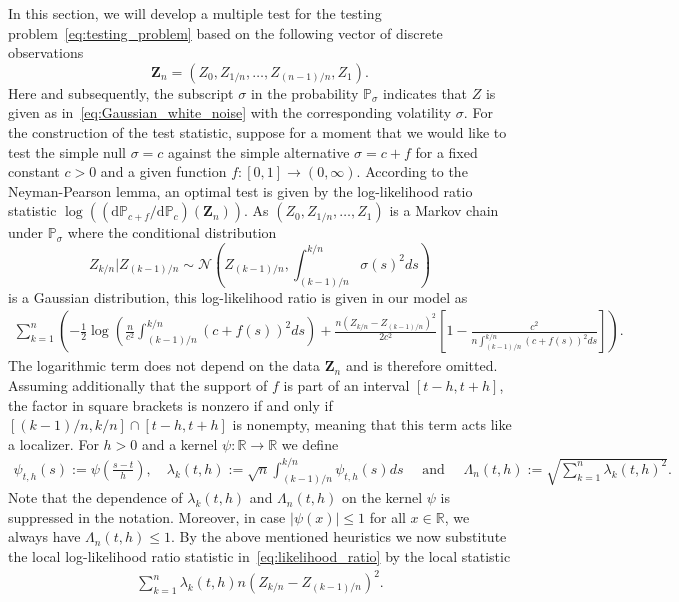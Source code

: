 \documentclass[10.5pt,letter]{article}
\numberwithin{equation}{section}
\theoremstyle{definition}
\newcommand{\R}{\mathbb{R}}
\renewcommand{\P}{\mathbb{P}}
\newcommand{\1}{\mathbbm{1}}
\begin{document}
In this section, we will develop a multiple test for the testing problem~\eqref{eq:testing_problem} based on the following vector of discrete observations
\[ \mathbf{Z}_n = \left( Z_0, Z_{1/n}, \dots, Z_{(n-1)/n}, Z_1\right).\]
Here and subsequently, the subscript $\sigma$ in the probability $\P_\sigma$ indicates that $Z$ is given as in~\eqref{eq:Gaussian_white_noise} with the corresponding volatility $\sigma$.
For the construction of the test statistic, suppose for a moment that we would like to test the simple null $\sigma=c$ against the simple alternative $\sigma=c+f$ for a fixed constant $c>0$ and a given function $f:[0,1]\rightarrow (0,\infty)$. According to the Neyman-Pearson lemma, an optimal test is given by the log-likelihood ratio statistic $\log((\textrm{d}\P_{c+f}/\textrm{d}\P_c)(\mathbf{Z}_n))$. As $(Z_0,Z_{1/n},\dots, Z_1)$ is a Markov chain under $\P_\sigma$ where the conditional distribution 
\[ Z_{k/n}|Z_{(k-1)/n}\sim\mathcal{N}\left(Z_{(k-1)/n}, \int_{(k-1)/n}^{k/n}\sigma(s)^2ds\right) \]
is a Gaussian distribution, this log-likelihood ratio is given in our model as
\begin{align}\label{eq:likelihood_ratio}
    \sum_{k=1}^n \left(-\frac12 \log\left(\frac{n}{c^2}\int_{(k-1)/n}^{k/n}(c+f(s))^2ds\right) + \frac{n(Z_{k/n}-Z_{(k-1)/n})^2}{2c^2} \left[1-\frac{c^2}{n\int_{(k-1)/n}^{k/n}(c+f(s))^2ds}\right] \right). 
\end{align}
The logarithmic term does not depend on the data $\mathbf{Z}_n$ and is therefore omitted. Assuming additionally that the support of $f$ is part of an interval $[t-h,t+h]$, the factor in square brackets is nonzero if and only if $[(k-1)/n,k/n]\cap [t-h,t+h]$ is nonempty, meaning that this term acts like a localizer. For $h>0$ and a kernel $\psi:\R\rightarrow \R$ we define
\begin{align}\label{eq:sigma_n}
    \psi_{t,h}(s) := \psi\left(\frac{s-t}{h}\right), \quad \lambda_k(t,h) := \sqrt{n}\int_{(k-1)/n}^{k/n} \psi_{t,h}(s) ds \quad\textrm{ and }\quad\Lambda_n(t,h) := \sqrt{\sum_{k=1}^n \lambda_k(t,h)^2}.
\end{align}
Note that the dependence of $\lambda_k(t,h)$ and $\Lambda_n(t,h)$ on the kernel $\psi$ is suppressed in the notation. Moreover, in case $|\psi(x)|\leq 1$ for all $x\in\R$, we always have $\Lambda_n(t,h)\leq 1$. By the above mentioned heuristics we now substitute the local log-likelihood ratio statistic in~\eqref{eq:likelihood_ratio} by the local statistic
\begin{align}\label{eq:local_statistic_unnormalized}
    \sum_{k=1}^n \lambda_k(t,h) n\left(Z_{k/n}- Z_{(k-1)/n}\right)^2.
\end{align} 
\end{document}
